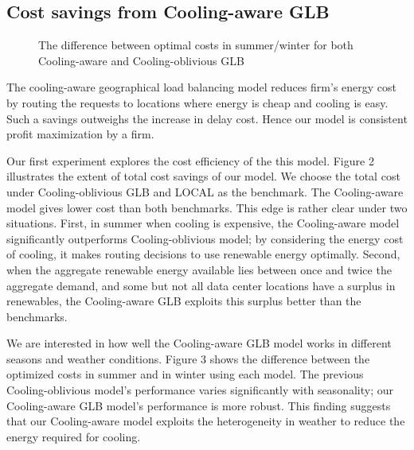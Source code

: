 \documentclass{acm_proc_article-sp}
\begin{document}
\subsection{Cost savings from Cooling-aware GLB}

\begin{figure}
\centering
{}
\caption{The difference between optimal costs in summer/winter for both Cooling-aware and Cooling-oblivious GLB}
\end{figure}

The cooling-aware geographical load balancing model reduces firm's energy cost by routing the requests to locations where energy is cheap and cooling is easy. Such a savings outweighs the increase in delay cost. Hence our model is consistent profit maximization by a firm.


Our first experiment explores the cost efficiency of the this model. Figure 2 illustrates the extent of total cost savings of our model. We choose the total cost under Cooling-oblivious GLB and LOCAL as the benchmark. The Cooling-aware model gives lower cost than both benchmarks. This edge is rather clear under two situations. First, in summer when cooling is expensive, the Cooling-aware model significantly outperforms Cooling-oblivious model; by considering the energy cost of cooling, it makes routing decisions to use renewable energy optimally. Second, when the aggregate renewable energy available lies between once and twice the aggregate demand, and some but not all data center locations have a surplus in renewables, the Cooling-aware GLB exploits this surplus better than the benchmarks.

We are interested in how well the Cooling-aware GLB model works in different seasons and weather conditions. Figure 3 shows the difference between the optimized costs in summer and in winter using each model. The previous Cooling-oblivious model's performance varies significantly with seasonality; our Cooling-aware GLB model's performance is more robust. This finding suggests that our Cooling-aware model exploits the heterogeneity in weather to reduce the energy required for cooling.
\end{document}
